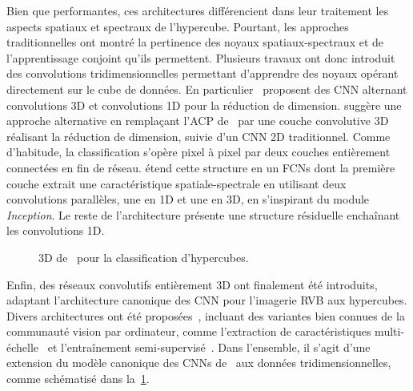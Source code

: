 Bien que performantes, ces architectures différencient dans leur traitement les aspects spatiaux et spectraux de l'hypercube. Pourtant, les approches traditionnelles ont montré la pertinence des noyaux spatiaux-spectraux et de l'apprentissage conjoint qu'ils permettent. Plusieurs travaux ont donc introduit des convolutions tridimensionnelles permettant d'apprendre des noyaux opérant directement sur le cube de données. En particulier~\citet{ben_hamida_deep_2016,chen_deep_2016} proposent des \gls{CNN} alternant convolutions 3D et convolutions 1D pour la réduction de dimension. \citet{luo_hsi-cnn_2018} suggère une approche alternative en remplaçant l'\gls{ACP} de~\citet{slavkovikj_hyperspectral_2015} par une couche convolutive 3D réalisant la réduction de dimension, suivie d'un \gls{CNN} 2D traditionnel. Comme d'habitude, la classification s'opère pixel à pixel par deux couches entièrement connectées en fin de réseau. \citet{lee_contextual_2016} étend cette structure en un \glspl{FCN} dont la première couche extrait une caractéristique spatiale-spectrale en utilisant deux convolutions parallèles, une en 1D et une en 3D, en s'inspirant du module \emph{Inception}. Le reste de l'architecture présente une structure résiduelle enchaînant les convolutions 1D.

\begin{figure}[h]
  \resizebox{\textwidth}{!}{}
  \caption[ 3D pour la classification d'hypercubes.]{ 3D de~\citet{chen_deep_2016} pour la classification d'hypercubes.}
  \label{fig:cnn3d_hsi}
\end{figure}

Enfin, des réseaux convolutifs entièrement 3D ont finalement été introduits, adaptant l'architecture canonique des \gls{CNN} pour l'imagerie \gls{RVB} aux hypercubes. Divers architectures ont été proposées~\cite{li_spectralspatial_2017}, incluant des variantes bien connues de la communauté vision par ordinateur, comme l'extraction de caractéristiques multi-échelle~\cite{he_multi-scale_2017} et l'entraînement semi-supervisé~\cite{liu_semi-supervised_2017}. Dans l'ensemble, il s'agit d'une extension du modèle canonique des \glspl{CNN} de~\citet{lecun_gradient-based_1998} aux données tridimensionnelles, comme schématisé dans la~\cref{fig:cnn3d_hsi}.

